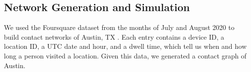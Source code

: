 \documentclass[times, 10pt,twocolumn]{article}
\begin{document}













\subsection{Network Generation and Simulation}

We used the Foursquare dataset from the months of July and August 2020 to build contact networks of Austin, TX \cite{DVN/PFLAH4_2020}. Each entry contains a device ID, a location ID, a UTC date and hour, and a dwell time, which tell us when and how long a person visited a location. Given this data, we generated a contact graph of Austin.

\end{document}
